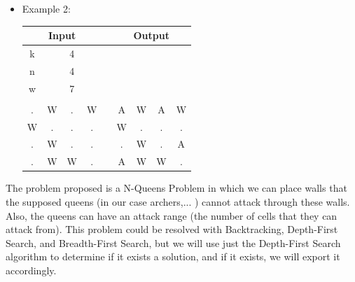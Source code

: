 \documentclass[12pt]{article}
\begin{document}
\begin{itemize}
\item Example 2:
\begin{tabular}{|cccc|c|cccc|}
\hline
\multicolumn{4}{|c|}{Input}                                                   &  & \multicolumn{4}{c|}{Output}                                                  \\ \hline
\multicolumn{1}{|c|}{k} & \multicolumn{1}{c|}{}  & \multicolumn{1}{c|}{4} &   &  & \multicolumn{1}{c|}{}  & \multicolumn{1}{c|}{}  & \multicolumn{1}{c|}{}  &   \\ \hline
\multicolumn{1}{|c|}{n} & \multicolumn{1}{c|}{}  & \multicolumn{1}{c|}{4} &   &  & \multicolumn{1}{c|}{}  & \multicolumn{1}{c|}{}  & \multicolumn{1}{c|}{}  &   \\ \hline
\multicolumn{1}{|c|}{w} & \multicolumn{1}{c|}{}  & \multicolumn{1}{c|}{7} &   &  & \multicolumn{1}{c|}{}  & \multicolumn{1}{c|}{}  & \multicolumn{1}{c|}{}  &   \\ \hline
\multicolumn{1}{|c|}{}  & \multicolumn{1}{c|}{}  & \multicolumn{1}{c|}{}  &   &  & \multicolumn{1}{c|}{}  & \multicolumn{1}{c|}{}  & \multicolumn{1}{c|}{}  &   \\ \hline
\multicolumn{1}{|c|}{.} & \multicolumn{1}{c|}{W} & \multicolumn{1}{c|}{.} & W &  & \multicolumn{1}{c|}{A} & \multicolumn{1}{c|}{W} & \multicolumn{1}{c|}{A} & W \\ \hline
\multicolumn{1}{|c|}{W} & \multicolumn{1}{c|}{.} & \multicolumn{1}{c|}{.} & . &  & \multicolumn{1}{c|}{W} & \multicolumn{1}{c|}{.} & \multicolumn{1}{c|}{.} & . \\ \hline
\multicolumn{1}{|c|}{.} & \multicolumn{1}{c|}{W} & \multicolumn{1}{c|}{.} & . &  & \multicolumn{1}{c|}{.} & \multicolumn{1}{c|}{W} & \multicolumn{1}{c|}{.} & A \\ \hline
\multicolumn{1}{|c|}{.} & \multicolumn{1}{c|}{W} & \multicolumn{1}{c|}{W} & . &  & \multicolumn{1}{c|}{A} & \multicolumn{1}{c|}{W} & \multicolumn{1}{c|}{W} & . \\ \hline
\end{tabular}
\vfill
\end{itemize}

    The problem proposed is a N-Queens Problem in which we can place walls that the supposed queens (in our case archers,... ) cannot attack through these walls. Also, the queens can have an attack range (the number of cells that they can attack from). This problem could be resolved with Backtracking, Depth-First Search, and Breadth-First Search, but we will use just the Depth-First Search algorithm to determine if it exists a solution, and if it exists, we will export it accordingly.
\end{document}
